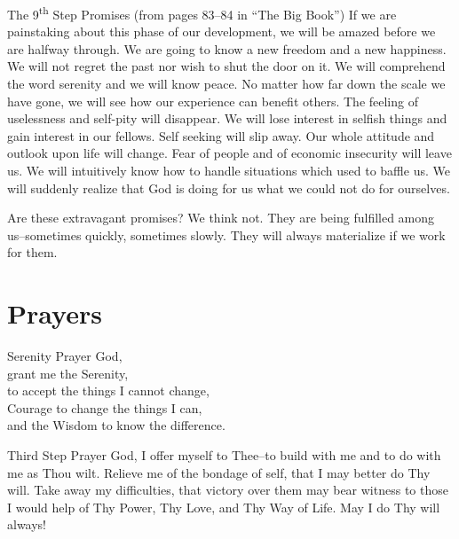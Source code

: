 \documentclass{beamer}
\begin{document}
 \begin{frame}[plain]
       \begin{exampleblock}{The 9\textsuperscript{th} Step Promises (from pages 83--84 in ``The Big Book'')}
 If we are painstaking about this phase of our
development, we will be amazed before we are
halfway through. We are going to know a new
freedom and a new happiness. We will not
regret the past nor wish to shut the door on it.
We will comprehend the word serenity and we
will know peace. No matter how far down the
scale we have gone, we will see how our
experience can benefit others. The feeling of
uselessness and self-pity will disappear. We will
lose interest in selfish things and gain interest in
our fellows. Self seeking will slip away. Our
whole attitude and outlook upon life will change.
Fear of people and of economic insecurity will
leave us. We will intuitively know how to handle
situations which used to baffle us. We will
suddenly realize that God is doing for us what
we could not do for ourselves.
\bigskip

Are these extravagant promises? We think not.
They are being fulfilled among us--sometimes
quickly, sometimes slowly. They will always
materialize if we work for them.
	\end{exampleblock}
\end{frame}
   
    \section*{Prayers}
        \begin{frame}[plain]\LARGE
        \begin{alertblock}{Serenity Prayer}
God, \\grant me the Serenity,\\ to accept the things I cannot change,\\ Courage to change the things I can, \\and the Wisdom to know the difference.
\end{alertblock}
    \end{frame}
    
            \begin{frame}[plain]\LARGE
        \begin{alertblock}{Third Step Prayer}
God, I offer myself to Thee--to build with me and to do with me as Thou wilt. Relieve me of the bondage of self, that I may better do Thy will. Take away my difficulties, that victory over them may bear witness to those I would help of Thy Power, Thy Love, and Thy Way of Life.  May I do Thy will always!
\end{alertblock}
    \end{frame}
    
\end{document}
